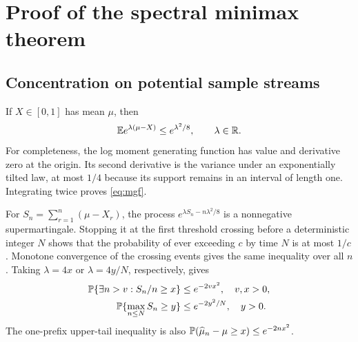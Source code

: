 \section{Proof of the spectral minimax theorem}\label{sec:spectral-proofs}
\subsection{Concentration on potential sample streams}
If $X\in[0,1]$ has mean $\mu$, then
\begin{equation}\label{eq:mgf}
 \mathbb E e^{\lambda(\mu-X)}\le e^{\lambda^2/8},\qquad \lambda\in\mathbb R.
\end{equation}
For completeness, the log moment generating function has value and derivative zero at the origin. Its second derivative is the variance under an exponentially tilted law, at most $1/4$ because its support remains in an interval of length one. Integrating twice proves \eqref{eq:mgf}.

For $S_n=\sum_{r=1}^n(\mu-X_r)$, the process $e^{\lambda S_n-n\lambda^2/8}$ is a nonnegative supermartingale. Stopping it at the first threshold crossing before a deterministic integer $N$ shows that the probability of ever exceeding $c$ by time $N$ is at most $1/c$. Monotone convergence of the crossing events gives the same inequality over all $n$. Taking $\lambda=4x$ or $\lambda=4y/N$, respectively, gives
\begin{align}
 \mathbb P\{\exists n>v:S_n/n\ge x\}&\le e^{-2vx^2},\quad v,x>0,\label{eq:large-prefix}\\
 \mathbb P\{\max_{n\le N}S_n\ge y\}&\le e^{-2y^2/N},\quad y>0.\label{eq:prefix-max}
\end{align}
The one-prefix upper-tail inequality is also $\mathbb P(\widehat\mu_n-\mu\ge x)\le e^{-2nx^2}$.

